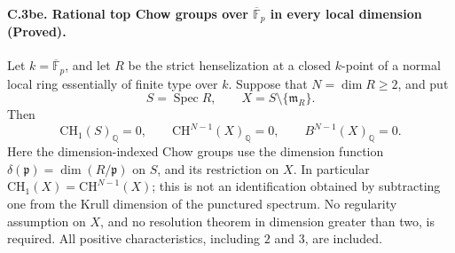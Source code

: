 \paragraph{C.3be. Rational top Chow groups over
\(\overline{\mathbb F}_p\) in every local dimension (Proved).}
Let \(k=\overline{\mathbb F}_p\), and let \(R\) be the strict
henselization at a closed \(k\)-point of a normal local ring
essentially of finite type over \(k\). Suppose that
\(N=\dim R\geq2\), and put
\[
 S=\operatorname{Spec}R,\qquad
 X=S\setminus\{\mathfrak m_R\}.
\]
Then
\begin{equation}\label{eq:C3be-top-vanishing}
       \mathrm{CH}_1(S)_{\mathbb Q}=0,
       \qquad \mathrm{CH}^{N-1}(X)_{\mathbb Q}=0,
       \qquad B^{N-1}(X)_{\mathbb Q}=0.
\end{equation}
Here the dimension-indexed Chow groups use the dimension function
\(\delta(\mathfrak p)=\dim(R/\mathfrak p)\) on \(S\), and its
restriction on \(X\). In particular
\(\mathrm{CH}_1(X)=\mathrm{CH}^{N-1}(X)\); this is not an
identification obtained by subtracting one from the Krull dimension
of the punctured spectrum. No regularity assumption on \(X\), and
no resolution theorem in dimension greater than two, is required.
All positive characteristics, including \(2\) and \(3\), are included.

